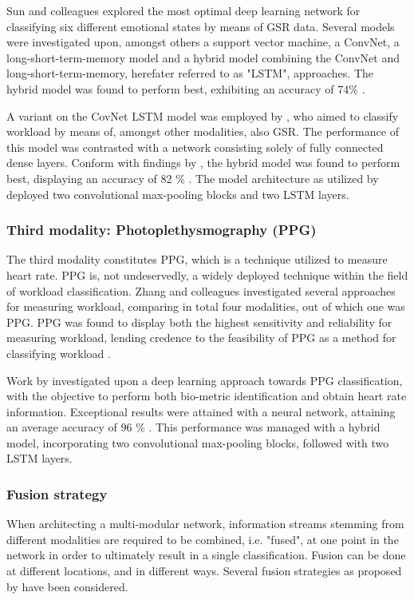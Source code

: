 \documentclass[12pt]{article}
\begin{document}
Sun and colleagues explored the most optimal deep learning network for classifying six different emotional states by means of GSR data. Several models were investigated upon, amongst others a support vector machine, a ConvNet, a long-short-term-memory model and a hybrid model combining the ConvNet and long-short-term-memory, herefater referred to as "LSTM", approaches. The hybrid model was found to perform best, exhibiting an accuracy of 74\% \cite{sun2019hybrid}. 

A variant on the CovNet LSTM model was employed by , who aimed to classify workload by means of, amongst other modalities, also GSR. The performance of this model was contrasted with a network consisting solely of fully connected dense layers. Conform with findings by  , the hybrid model was found to perform best, displaying an accuracy of 82 \% \cite{dolmans2020perceived}. The model architecture as utilized by  deployed two convolutional max-pooling blocks and two LSTM layers.

\subsubsection{Third modality: Photoplethysmography (PPG)}
The third modality constitutes PPG, which is a technique utilized to measure heart rate. PPG is, not undeservedly, a widely deployed technique within the field of workload classification. Zhang and colleagues investigated several approaches for measuring workload, comparing in total four modalities, out of which one was PPG. PPG was found to display both the highest sensitivity and reliability for measuring workload, lending credence to the feasibility of PPG as a method for classifying workload \cite{zhang2018evaluating}. 

Work by  investigated upon a deep learning approach towards PPG classification, with the objective to perform both bio-metric identification and obtain heart rate information. Exceptional results were attained with a neural network, attaining an average accuracy of 96 \% \cite{biswas2019cornet}. This performance was managed with a hybrid model, incorporating two convolutional max-pooling blocks, followed with two LSTM layers. 

\subsubsection{Fusion strategy}  
When architecting a multi-modular network, information streams stemming from different modalities are required to be combined, i.e. "fused", at one point in the network in order to ultimately result in a single classification. Fusion can be done at different locations, and in different ways. Several fusion strategies as proposed by  have been considered.
\end{document}
